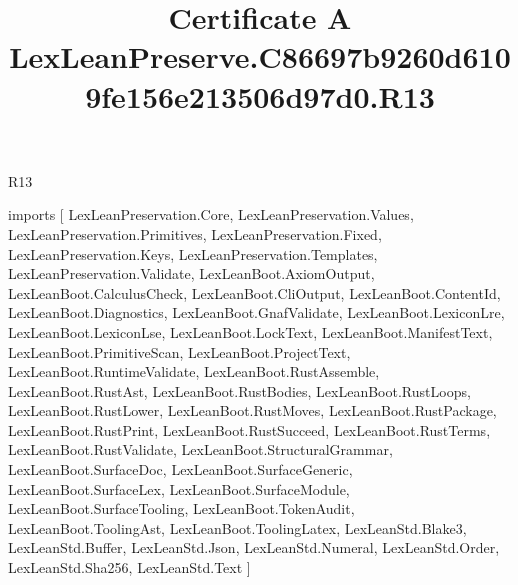 \begin{lexlean}{R13}
\title{Certificate A LexLeanPreserve.C86697b9260d6109fe156e213506d97d0.R13}
\begin{coremodule}
imports [
  LexLeanPreservation.Core,
  LexLeanPreservation.Values,
  LexLeanPreservation.Primitives,
  LexLeanPreservation.Fixed,
  LexLeanPreservation.Keys,
  LexLeanPreservation.Templates,
  LexLeanPreservation.Validate,
  LexLeanBoot.AxiomOutput,
  LexLeanBoot.CalculusCheck,
  LexLeanBoot.CliOutput,
  LexLeanBoot.ContentId,
  LexLeanBoot.Diagnostics,
  LexLeanBoot.GnafValidate,
  LexLeanBoot.LexiconLre,
  LexLeanBoot.LexiconLse,
  LexLeanBoot.LockText,
  LexLeanBoot.ManifestText,
  LexLeanBoot.PrimitiveScan,
  LexLeanBoot.ProjectText,
  LexLeanBoot.RuntimeValidate,
  LexLeanBoot.RustAssemble,
  LexLeanBoot.RustAst,
  LexLeanBoot.RustBodies,
  LexLeanBoot.RustLoops,
  LexLeanBoot.RustLower,
  LexLeanBoot.RustMoves,
  LexLeanBoot.RustPackage,
  LexLeanBoot.RustPrint,
  LexLeanBoot.RustSucceed,
  LexLeanBoot.RustTerms,
  LexLeanBoot.RustValidate,
  LexLeanBoot.StructuralGrammar,
  LexLeanBoot.SurfaceDoc,
  LexLeanBoot.SurfaceGeneric,
  LexLeanBoot.SurfaceLex,
  LexLeanBoot.SurfaceModule,
  LexLeanBoot.SurfaceTooling,
  LexLeanBoot.TokenAudit,
  LexLeanBoot.ToolingAst,
  LexLeanBoot.ToolingLatex,
  LexLeanStd.Blake3,
  LexLeanStd.Buffer,
  LexLeanStd.Json,
  LexLeanStd.Numeral,
  LexLeanStd.Order,
  LexLeanStd.Sha256,
  LexLeanStd.Text
]


\end{coremodule}
\end{lexlean}

